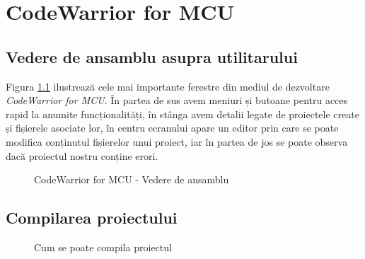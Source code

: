 \chapter{CodeWarrior for MCU}

\section{Vedere de ansamblu asupra utilitarului}
Figura \ref{fig:CodeWarrior-VedereDeAnsamblu} ilustrează cele mai importante ferestre din mediul de dezvoltare \textit{CodeWarrior for MCU}. În partea de sus avem meniuri și butoane pentru acces rapid la anumite funcționalități, în stânga avem detalii legate de proiectele create și fișierele asociate lor, în centru ecranului apare un editor prin care se poate modifica conținutul fișierelor unui proiect, iar în partea de jos se poate observa dacă proiectul nostru conține erori.

\begin{figure}[h!]
  \vspace{-20pt}
  \vspace{-15pt}
  \caption{\label{fig:CodeWarrior-VedereDeAnsamblu} CodeWarrior for MCU - Vedere de ansamblu}
  \vspace{-20pt}
\end{figure}

\section{Compilarea proiectului}

\begin{figure}
  \vspace{-20pt}
  \vspace{-10pt}
  \caption{\label{fig:CodeWarrior-CompilareProiect} Cum se poate compila proiectul}
  \vspace{-20pt}
\end{figure}

